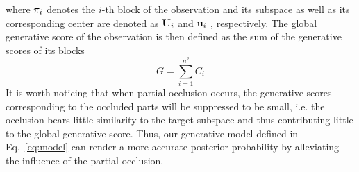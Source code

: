 \documentclass[preprint,12pt,review]{elsarticle}
\begin{document}
where ${\bf{\pi}}_i$ denotes the $i$-th block of the observation and its subspace as well as its corresponding center are denoted as ${{\bf{U}}_{i}}$ and ${{\bf{u}}_{i}}$ , respectively.
The global generative score of the observation is then defined as the sum of the generative scores of its blocks
\begin{equation}\label{eq:model}
  G = \sum \limits_{i=1}^{n^2} C_i
\end{equation}
It is worth noticing that when partial occlusion occurs, the generative scores corresponding to the occluded parts will be suppressed to be small, i.e. the occlusion bears little similarity to the target subspace and thus contributing little to the global generative score.
Thus, our generative model defined in Eq.~\ref{eq:model} can render a more accurate posterior probability by alleviating the influence of the partial occlusion.
\end{document}
